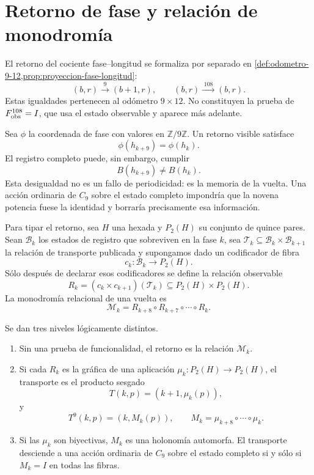 \section{Retorno de fase y relación de monodromía}

El retorno del cociente fase--longitud se formaliza por separado en
\cref{def:odometro-9-12,prop:proyeccion-fase-longitud}:
\[
(b,r)\xrightarrow{\;9\;}(b+1,r),
\qquad
(b,r)\xrightarrow{\;108\;}(b,r).
\]
Estas igualdades pertenecen al odómetro \(9\times12\). No constituyen la
prueba de \(F_{\rm obs}^{108}=I\), que usa el estado observable y aparece más
adelante.

Sea \(\phi\) la coordenada de fase con valores en \(\mathbb Z/9\mathbb Z\).
Un retorno visible satisface
\[
 \phi(h_{k+9})=\phi(h_k).
\]
El registro completo puede, sin embargo, cumplir
\[
 B(h_{k+9})\ne B(h_k).
\]
Esta desigualdad no es un fallo de periodicidad: es la memoria de la vuelta.
Una acción ordinaria de \(C_9\) sobre el estado completo impondría que la
novena potencia fuese la identidad y borraría precisamente esa información.

Para tipar el retorno, sea \(H\) una hexada y
\(P_2(H)\) su conjunto de quince pares. Sean \(\mathcal B_k\) los estados de
registro que sobreviven en la fase \(k\), sea
\(\mathcal T_k\subseteq\mathcal B_k\times\mathcal B_{k+1}\) la relación de
transporte publicada y supongamos dado un codificador de fibra
\[
 c_k:\mathcal B_k\longrightarrow P_2(H).
\]
Sólo después de declarar esos codificadores se define la relación observable
\[
 R_k=(c_k\times c_{k+1})(\mathcal T_k)
 \subseteq P_2(H)\times P_2(H).
\]
La monodromía relacional de una vuelta es
\[
 \mathcal M_k
 =R_{k+8}\circ R_{k+7}\circ\cdots\circ R_k.
\]

\begin{proposition}
\label{prop:clasificacion-retorno-nonadico}
Se dan tres niveles lógicamente distintos.
\begin{enumerate}
  \item Sin una prueba de funcionalidad, el retorno es la relación
  \(\mathcal M_k\).
  \item Si cada \(R_k\) es la gráfica de una aplicación
  \(\mu_k:P_2(H)\to P_2(H)\), el transporte es el producto sesgado
  \[
   T(k,p)=(k+1,\mu_k(p)),
  \]
  y
  \[
   T^9(k,p)=(k,M_k(p)),
   \qquad
   M_k=\mu_{k+8}\circ\cdots\circ\mu_k.
  \]
  \item Si las \(\mu_k\) son biyectivas, \(M_k\) es una holonomía
  automorfa. El transporte desciende a una acción ordinaria de
  \(C_9\) sobre el estado completo si y sólo si \(M_k=I\) en todas las
  fibras.
\end{enumerate}
\end{proposition}

